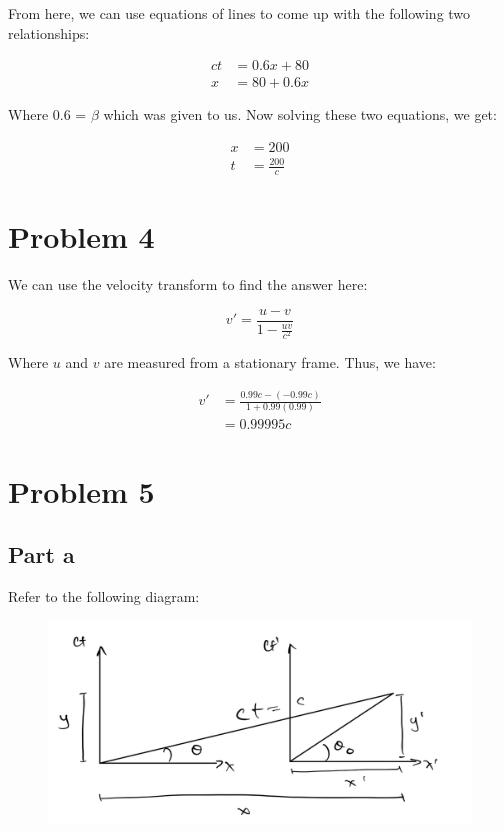 \documentclass{article}
\theoremstyle{definition}
\numberwithin{equation}{section}
\numberwithin{definition}{section}
\begin{document}
	From here, we can use equations of lines to come up with the following two relationships:
	
	\begin{align*}
		ct &= 0.6x + 80\\
		x &= 80 + 0.6x
	\end{align*}

	Where 0.6 = $\beta$ which was given to us. Now solving these two equations, we get:
	
	\begin{align*}
	x &= 200\\
	t &= \frac{200}{c}
	\end{align*}

	\section{Problem 4}
	
	We can use the velocity transform to find the answer here:
	
	\[ v' = \frac{u-v}{1-\frac{uv}{c^2}}\]
	
	Where $u$ and $v$ are measured from a stationary frame. Thus, we have:
	
	\begin{align*}
		v' &= \frac{0.99c - (-0.99c)}{1+0.99(0.99)}\\
		&= 0.99995c
	\end{align*}

	
	\section{Problem 5}
	
	\subsection{Part a}
	
	Refer to the following diagram:
	
	
	\begin{figure}[H]
		\centering
		\includegraphics[scale=0.3]{Q5.jpg}
		\end{figure}
	
\end{document}
